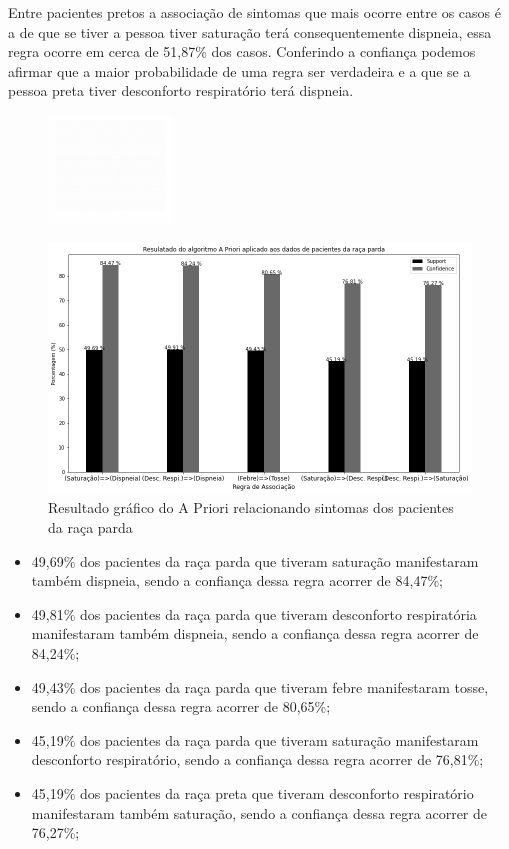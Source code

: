 \documentclass[tcc1]{uftex}
\begin{document}
    Entre pacientes pretos a associação de sintomas que mais ocorre entre os casos é a de que se tiver a pessoa tiver saturação terá consequentemente dispneia, essa regra ocorre em cerca de 51,87\% dos casos. Conferindo a confiança podemos afirmar que a maior probabilidade de uma regra ser verdadeira e a que se a pessoa preta tiver desconforto respiratório terá dispneia.
    
    \begin{figure}[!h]
    \centering
    \includegraphics[width=3.3cm]{fund0.png}
    \end{figure}
    
    \begin{figure}[!h]
    \centering
    \includegraphics[width=14cm]{1_Parda_apriori.jpg}
    \caption{Resultado gráfico do A Priori relacionando sintomas dos pacientes da raça parda}
    \end{figure}
    
  \begin{itemize}
    \item 49,69\% dos pacientes da raça parda que tiveram saturação manifestaram também dispneia, sendo a confiança dessa regra acorrer de 84,47\%;
    
    \item 49,81\% dos pacientes da raça parda que tiveram desconforto respiratória manifestaram também dispneia, sendo a confiança dessa regra acorrer de 84,24\%;
    
    \item 49,43\% dos pacientes da raça parda que tiveram febre manifestaram tosse, sendo a confiança dessa regra acorrer de 80,65\%;
    
    \item 45,19\% dos pacientes da raça parda que tiveram saturação manifestaram desconforto respiratório, sendo a confiança dessa regra acorrer de 76,81\%;
    
    \item 45,19\% dos pacientes da raça preta que tiveram desconforto respiratório manifestaram também saturação, sendo a confiança dessa regra acorrer de 76,27\%;
    \end{itemize}
    
\end{document}
